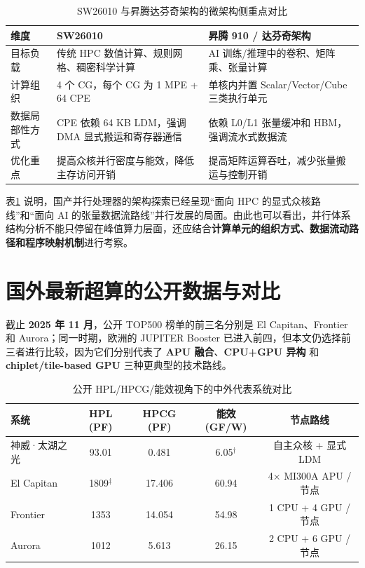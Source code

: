\documentclass[a4paper]{article}
\begin{document}
\begin{table}[htbp]
  \centering
  \small
  \begin{tabular}{p{2.1cm}p{4.4cm}p{4.8cm}}
  \toprule
  维度 & SW26010 & 昇腾 910 / 达芬奇架构 \\
  \midrule
  目标负载 & 传统 HPC 数值计算、规则网格、稠密科学计算 & AI 训练/推理中的卷积、矩阵乘、张量计算 \\
  计算组织 & 4 个 CG，每个 CG 为 1 MPE + 64 CPE & 单核内并置 Scalar/Vector/Cube 三类执行单元 \\
  数据局部性方式 & CPE 依赖 64 KB LDM，强调 DMA 显式搬运和寄存器通信 & 依赖 L0/L1 张量缓冲和 HBM，强调流水式数据流 \\
  优化重点 & 提高众核并行密度与能效，降低主存访问开销 & 提高矩阵运算吞吐，减少张量搬运与控制开销 \\
  \bottomrule
  \end{tabular}
  \caption{SW26010 与昇腾达芬奇架构的微架构侧重点对比}
  \label{table:sw_vs_davinci}
\end{table}

表\ref{table:sw_vs_davinci} 说明，国产并行处理器的架构探索已经呈现“面向 HPC 的显式众核路线”和“面向 AI 的张量数据流路线”并行发展的局面。由此也可以看出，并行体系结构分析不能只停留在峰值算力层面，还应结合\textbf{计算单元的组织方式、数据流动路径和程序映射机制}进行考察。

\section{国外最新超算的公开数据与对比}
截止 \textbf{2025 年 11 月}，公开 TOP500 榜单的前三名分别是 El Capitan、Frontier 和 Aurora；同一时期，欧洲的 JUPITER Booster 已进入前四，但本文仍选择前三者进行比较，因为它们分别代表了 \textbf{APU 融合}、\textbf{CPU+GPU 异构} 和 \textbf{chiplet/tile-based GPU} 三种更典型的技术路线\cite{top500_2025_11,hpcg_2025_11,green500_2025_11}。

\begin{table}[htbp]
  \centering
  \footnotesize
  \begin{tabular}{lcccc}
  \toprule
  系统 & HPL (PF) & HPCG (PF) & 能效 (GF/W) & 节点路线 \\
  \midrule
  神威·太湖之光 & 93.01 & 0.481 & 6.05$^\dagger$ & 自主众核 + 显式 LDM \\
  El Capitan & 1809$^\ddagger$ & 17.406 & 60.94 & 4$\times$ MI300A APU / 节点 \\
  Frontier & 1353 & 14.054 & 54.98 & 1 CPU + 4 GPU / 节点 \\
  Aurora & 1012 & 5.613 & 26.15 & 2 CPU + 6 GPU / 节点 \\
  \bottomrule
  \end{tabular}
  \caption{公开 HPL/HPCG/能效视角下的中外代表系统对比}
  \label{table:compare}
\end{table}
\end{document}
